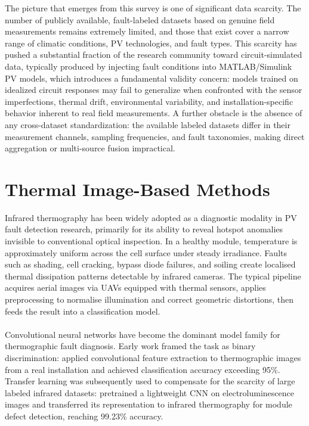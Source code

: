 The picture that emerges from this survey is one of significant data scarcity. The number of publicly available, fault-labeled datasets based on genuine field measurements remains extremely limited, and those that exist cover a narrow range of climatic conditions, PV technologies, and fault types. This scarcity has pushed a substantial fraction of the research community toward circuit-simulated data, typically produced by injecting fault conditions into MATLAB/Simulink PV models, which introduces a fundamental validity concern: models trained on idealized circuit responses may fail to generalize when confronted with the sensor imperfections, thermal drift, environmental variability, and installation-specific behavior inherent to real field measurements. A further obstacle is the absence of any cross-dataset standardization: the available labeled datasets differ in their measurement channels, sampling frequencies, and fault taxonomies, making direct aggregation or multi-source fusion impractical.

\section{Thermal Image-Based Methods}
\label{sec:thermal}

Infrared thermography has been widely adopted as a diagnostic modality in PV fault detection research, primarily for its ability to reveal hotspot anomalies invisible to conventional optical inspection. In a healthy module, temperature is approximately uniform across the cell surface under steady irradiance. Faults such as shading, cell cracking, bypass diode failures, and soiling create localised thermal dissipation patterns detectable by infrared cameras. The typical pipeline acquires aerial images via UAVs equipped with thermal sensors, applies preprocessing to normalise illumination and correct geometric distortions, then feeds the result into a classification model.

\paragraph{}
Convolutional neural networks have become the dominant model family for thermographic fault diagnosis. Early work framed the task as binary discrimination: \citet{manno2021thermal} applied convolutional feature extraction to thermographic images from a real installation and achieved classification accuracy exceeding 95\%. Transfer learning was subsequently used to compensate for the scarcity of large labeled infrared datasets: \citet{akram2020transfer} pretrained a lightweight CNN on electroluminescence images and transferred its representation to infrared thermography for module defect detection, reaching 99.23\% accuracy.

